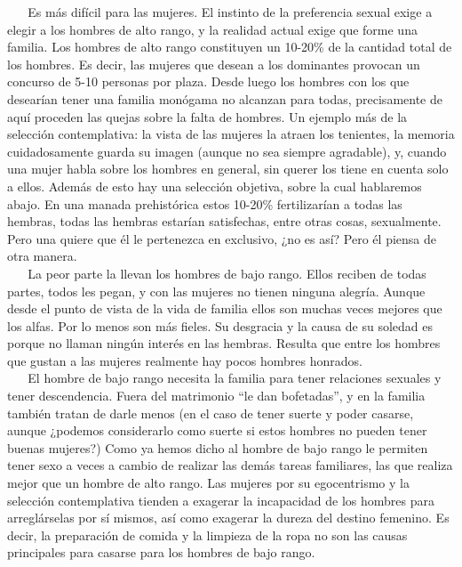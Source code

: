 \hspace*{0.333em} ~ ~ Es más difícil para las mujeres. El instinto de la
preferencia sexual exige a elegir a los hombres de alto rango, y la
realidad actual exige que forme una familia. Los hombres de alto rango
constituyen un 10-20\% de la cantidad total de los hombres. Es decir,
las mujeres que desean a los dominantes provocan un concurso de 5-10
personas por plaza. Desde luego los hombres con los que desearían tener
una familia monógama no alcanzan para todas, precisamente de aquí
proceden las quejas sobre la falta de hombres. Un ejemplo más de la
selección contemplativa: la vista de las mujeres la atraen los
tenientes, la memoria cuidadosamente guarda su imagen (aunque no sea
siempre agradable), y, cuando una mujer habla sobre los hombres en
general, sin querer los tiene en cuenta solo a ellos. Además de esto hay
una selección objetiva, sobre la cual hablaremos abajo. En una manada
prehistórica estos 10-20\% fertilizarían a todas las hembras, todas las
hembras estarían satisfechas, entre otras cosas, sexualmente. Pero una
quiere que él le pertenezca en exclusivo, ¿no es así? Pero él piensa de
otra manera.\\
\hspace*{0.333em} ~ ~ La peor parte la llevan los hombres de bajo rango.
Ellos reciben de todas partes, todos les pegan, y con las mujeres no
tienen ninguna alegría. Aunque desde el punto de vista de la vida de
familia ellos son muchas veces mejores que los alfas. Por lo menos son
más fieles. Su desgracia y la causa de su soledad es porque no llaman
ningún interés en las hembras. Resulta que entre los hombres que gustan
a las mujeres realmente hay pocos hombres honrados.\\
\hspace*{0.333em} ~ ~ El hombre de bajo rango necesita la familia para
tener relaciones sexuales y tener descendencia. Fuera del matrimonio
``le dan bofetadas'', y en la familia también tratan de darle menos (en
el caso de tener suerte y poder casarse, aunque ¿podemos considerarlo
como suerte si estos hombres no pueden tener buenas mujeres?) Como ya
hemos dicho al hombre de bajo rango le permiten tener sexo a veces a
cambio de realizar las demás tareas familiares, las que realiza mejor
que un hombre de alto rango. Las mujeres por su egocentrismo y la
selección contemplativa tienden a exagerar la incapacidad de los hombres
para arreglárselas por sí mismos, así como exagerar la dureza del
destino femenino. Es decir, la preparación de comida y la limpieza de la
ropa no son las causas principales para casarse para los hombres de bajo
rango.

